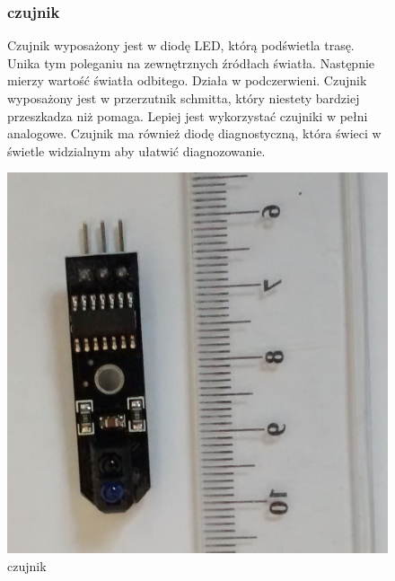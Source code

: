\documentclass[a4paper,11pt]{article}
\def\SCALE{0.6}
\begin{document}
\begin{figure}[H]
	\subsubsection{czujnik}
	Czujnik wyposażony jest w diodę LED, którą podświetla trasę. Unika tym poleganiu na zewnętrznych źródłach światła. Następnie mierzy wartość światła odbitego. Działa w podczerwieni. Czujnik wyposażony jest w przerzutnik schmitta, który niestety bardziej przeszkadza niż pomaga. Lepiej jest wykorzystać czujniki w pełni analogowe. Czujnik ma również diodę diagnostyczną, która świeci w świetle widzialnym aby ułatwić diagnozowanie.
	
	\centering
	\includegraphics[width=\SCALE
	\paperwidth]{czujnik}
	\caption{czujnik}

\end{figure}
\end{document}
